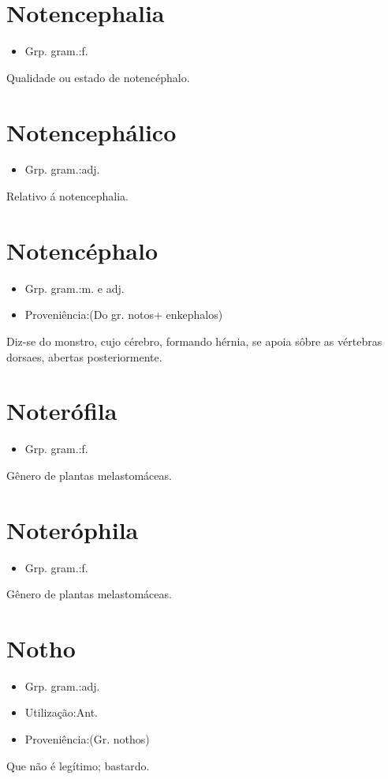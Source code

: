 \section{Notencephalia}
\begin{itemize}
\item {Grp. gram.:f.}
\end{itemize}
Qualidade ou estado de notencéphalo.
\section{Notencephálico}
\begin{itemize}
\item {Grp. gram.:adj.}
\end{itemize}
Relativo á notencephalia.
\section{Notencéphalo}
\begin{itemize}
\item {Grp. gram.:m.  e  adj.}
\end{itemize}
\begin{itemize}
\item {Proveniência:(Do gr. \textunderscore notos\textunderscore  + \textunderscore enkephalos\textunderscore )}
\end{itemize}
Diz-se do monstro, cujo cérebro, formando hérnia, se apoia sôbre as vértebras dorsaes, abertas posteriormente.
\section{Noterófila}
\begin{itemize}
\item {Grp. gram.:f.}
\end{itemize}
Gênero de plantas melastomáceas.
\section{Noteróphila}
\begin{itemize}
\item {Grp. gram.:f.}
\end{itemize}
Gênero de plantas melastomáceas.
\section{Notho}
\begin{itemize}
\item {Grp. gram.:adj.}
\end{itemize}
\begin{itemize}
\item {Utilização:Ant.}
\end{itemize}
\begin{itemize}
\item {Proveniência:(Gr. \textunderscore nothos\textunderscore )}
\end{itemize}
Que não é legítimo; bastardo.
